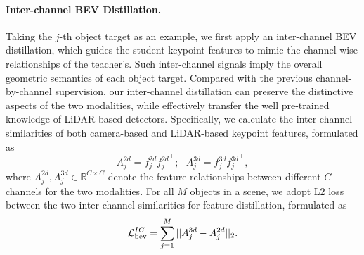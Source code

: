 
\paragraph{Inter-channel BEV Distillation.}
Taking the $j$-th object target as an example, we first apply an inter-channel BEV distillation, which guides the student keypoint features to mimic the channel-wise relationships of the teacher's. Such inter-channel signals imply the overall geometric semantics of each object target. Compared with the previous channel-by-channel supervision, our inter-channel distillation can preserve the distinctive aspects of the two modalities, while effectively transfer the well pre-trained knowledge of LiDAR-based detectors. Specifically, we calculate the inter-channel similarities of both camera-based and LiDAR-based keypoint features, formulated as
\begin{equation}
    A_j^{2d} = f_j^{2d} {f_j^{2d}}^{\top};\ \ \ A_j^{3d} = f_j^{3d} {f_j^{3d}}^{\top},
\end{equation}
where $A_j^{2d}, A_j^{3d} \in {\mathbb{R}^{C\times C}}$ denote the feature relationships between different $C$ channels for the two modalities. For all $M$ objects in a scene, we adopt L2 loss between the two inter-channel similarities for feature distillation, formulated as
\begin{equation}
    \mathcal{L}_{\rm{bev}}^{{IC}}= \sum_{j=1}^{M} ||A_j^{3d}-A_j^{2d}||_2.
    \label{eq:fm}
\end{equation}

